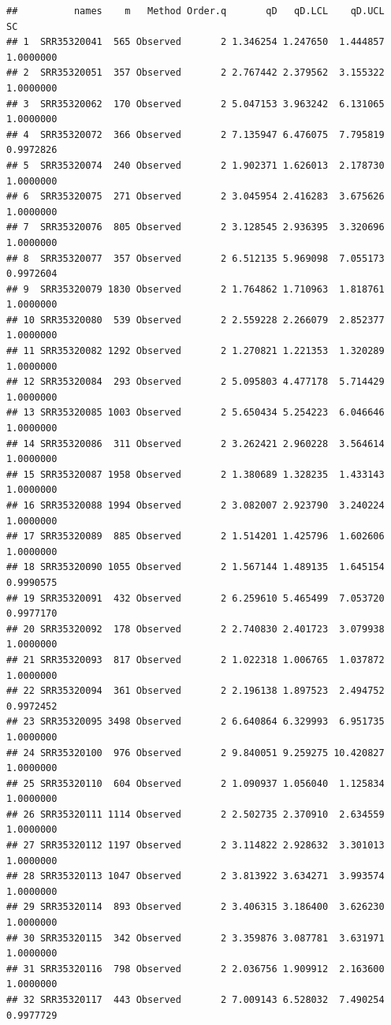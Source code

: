 \documentclass[
]{article}
\begin{document}
\begin{verbatim}
##          names    m   Method Order.q       qD   qD.LCL    qD.UCL        SC
## 1  SRR35320041  565 Observed       2 1.346254 1.247650  1.444857 1.0000000
## 2  SRR35320051  357 Observed       2 2.767442 2.379562  3.155322 1.0000000
## 3  SRR35320062  170 Observed       2 5.047153 3.963242  6.131065 1.0000000
## 4  SRR35320072  366 Observed       2 7.135947 6.476075  7.795819 0.9972826
## 5  SRR35320074  240 Observed       2 1.902371 1.626013  2.178730 1.0000000
## 6  SRR35320075  271 Observed       2 3.045954 2.416283  3.675626 1.0000000
## 7  SRR35320076  805 Observed       2 3.128545 2.936395  3.320696 1.0000000
## 8  SRR35320077  357 Observed       2 6.512135 5.969098  7.055173 0.9972604
## 9  SRR35320079 1830 Observed       2 1.764862 1.710963  1.818761 1.0000000
## 10 SRR35320080  539 Observed       2 2.559228 2.266079  2.852377 1.0000000
## 11 SRR35320082 1292 Observed       2 1.270821 1.221353  1.320289 1.0000000
## 12 SRR35320084  293 Observed       2 5.095803 4.477178  5.714429 1.0000000
## 13 SRR35320085 1003 Observed       2 5.650434 5.254223  6.046646 1.0000000
## 14 SRR35320086  311 Observed       2 3.262421 2.960228  3.564614 1.0000000
## 15 SRR35320087 1958 Observed       2 1.380689 1.328235  1.433143 1.0000000
## 16 SRR35320088 1994 Observed       2 3.082007 2.923790  3.240224 1.0000000
## 17 SRR35320089  885 Observed       2 1.514201 1.425796  1.602606 1.0000000
## 18 SRR35320090 1055 Observed       2 1.567144 1.489135  1.645154 0.9990575
## 19 SRR35320091  432 Observed       2 6.259610 5.465499  7.053720 0.9977170
## 20 SRR35320092  178 Observed       2 2.740830 2.401723  3.079938 1.0000000
## 21 SRR35320093  817 Observed       2 1.022318 1.006765  1.037872 1.0000000
## 22 SRR35320094  361 Observed       2 2.196138 1.897523  2.494752 0.9972452
## 23 SRR35320095 3498 Observed       2 6.640864 6.329993  6.951735 1.0000000
## 24 SRR35320100  976 Observed       2 9.840051 9.259275 10.420827 1.0000000
## 25 SRR35320110  604 Observed       2 1.090937 1.056040  1.125834 1.0000000
## 26 SRR35320111 1114 Observed       2 2.502735 2.370910  2.634559 1.0000000
## 27 SRR35320112 1197 Observed       2 3.114822 2.928632  3.301013 1.0000000
## 28 SRR35320113 1047 Observed       2 3.813922 3.634271  3.993574 1.0000000
## 29 SRR35320114  893 Observed       2 3.406315 3.186400  3.626230 1.0000000
## 30 SRR35320115  342 Observed       2 3.359876 3.087781  3.631971 1.0000000
## 31 SRR35320116  798 Observed       2 2.036756 1.909912  2.163600 1.0000000
## 32 SRR35320117  443 Observed       2 7.009143 6.528032  7.490254 0.9977729

\end{verbatim}
\end{document}
